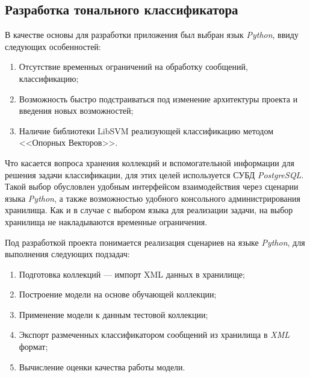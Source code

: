 \subsection{Разработка тонального классификатора}
    В качестве основы для разработки приложения был выбран язык {\it Python},
    ввиду следующих особенностей:
    \begin{enumerate}
        \item Отсутствие временных ограничений на обработку сообщений,
            классификацию;
        \item Возможность быстро подстраиваться под изменение архитектуры
            проекта и введения новых возможностей;
        \item Наличие библиотеки LibSVM реализующей
            классификацию методом <<Опорных Векторов>>.\cite{svmClassifier}
    \end{enumerate}

    Что касается вопроса хранения коллекций и вспомогательной информации
    для решения задачи классификации, для этих целей используется СУБД
    {\it PostgreSQL}. Такой выбор обусловлен удобным интерфейсом взаимодействия
    через сценарии языка {\it Python}, а также возможностью удобного консольного
    администрирования хранилища. Как и в случае с выбором языка для реализации
    задачи, на выбор хранилища не накладываются временные ограничения.

    Под разработкой проекта понимается реализация сценариев на языке {\it Python},
    для выполнения следующих подзадач:
    \begin{enumerate}
        \item Подготовка коллекций --- импорт XML данных в хранилище;
        \item Построение модели на основе обучающей коллекции;
        \item Применение модели к данным тестовой коллекции;
        \item Экспорт размеченных классификатором сообщений из хранилища в {\it XML} формат;
        \item Вычисление оценки качества работы модели.
    \end{enumerate}

